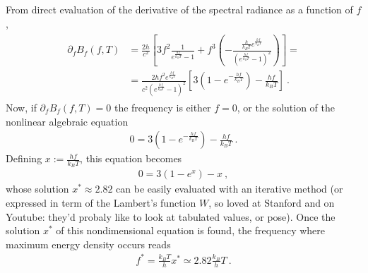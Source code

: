 \documentclass[letterpaper,10pt,english]{jupyterBook}
\begin{document}
\sphinxAtStartPar
From direct evaluation of the derivative of the spectral radiance as a function of \(f\),
\begin{equation*}
\begin{split}\begin{aligned}
  \partial_f B_{f}(f,T)
  & = \frac{2 h}{c^2} \left[ 3 f^2 \frac{1}{e^{\frac{hf}{k_B T}}-1} + f^3 \left(-\frac{\frac{h}{k_B T} e^{\frac{hf}{k_B T}}}{\left( e^{\frac{hf}{k_B T}} - 1 \right)^2}  \right) \right] = \\
  & = \frac{2 h f^2 e^{\frac{hf}{k_B T}}}{c^2 \left( e^{\frac{hf}{k_B T}} - 1 \right)^2} \left[ 3 \left( 1 - e^{-\frac{hf}{k_B T}} \right) - \frac{h f}{k_B T}  \right] \ .
\end{aligned}\end{split}
\end{equation*}
\sphinxAtStartPar
Now, if \(\partial_f B_{f}(f,T) = 0\) the frequency is either \(f = 0\), or the solution of the nonlinear algebraic equation
\begin{equation*}
\begin{split}0 = 3 \left(1 - e^{-\frac{h f}{k_B T}} \right) - \frac{hf}{k_B T} \ .\end{split}
\end{equation*}
\sphinxAtStartPar
Defining \(x := \frac{h f}{k_B T}\), this equation becomes
\begin{equation*}
\begin{split}0 = 3 (1 - e^x) - x \ ,\end{split}
\end{equation*}
\sphinxAtStartPar
whose solution \(x^* \approx 2.82\) can be easily evaluated with an iterative method (or expressed in term of the Lambert’s function \(W\), so loved at Stanford and on Youtube: they’d probaly like to look at tabulated values, or pose). Once the solution \(x^*\) of this non\sphinxhyphen{}dimensional equation is found, the frequency where maximum energy density occurs reads
\begin{equation*}
\begin{split}f^* = \frac{k_B T}{h} x^* \simeq 2.82 \frac{k_B}{h} T \ .\end{split}
\end{equation*}
\end{document}
